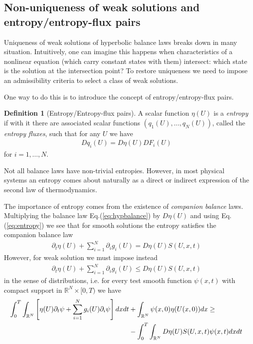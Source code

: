 \documentclass[11pt, reqno]{amsart}
\newcommand{\eqr}[1]{Eq.\thinspace(#1)}
\newcommand{\spfrac}[2]{{\partial_{#1}} {#2}}
\theoremstyle{definition}
\newtheorem{dfn}{Definition}
\begin{document}
\subsection{Non-uniqueness of weak solutions and entropy/entropy-flux pairs}

Uniqueness of weak solutions of hyperbolic balance laws breaks down in
many situation. Intuitively, one can imagine this happens when
characteristics of a nonlinear equation (which carry constant states
with them) intersect: which state is the solution at the intersection
point?  To restore uniqueness we need to impose an admissibility
criteria to select a class of weak solutions.

One way to do this is to introduce the concept of entropy/entropy-flux
pairs.
\begin{dfn}[Entropy/Entropy-flux pairs]
  A scalar function $\eta(U)$ is a \emph{entropy} if with it there are
  associated scalar functions $\left(q_1(U), \ldots, q_N(U)\right)$,
  called the \emph{entropy fluxes}, such that for any $U$ we have
  \begin{align}
    Dq_i(U) = D\eta(U) DF_i(U) \label{eq:entropy}
  \end{align}
  for $i=1,\ldots,N$.
\end{dfn}
Not all balance laws have non-trivial entropies. However, in most
physical systems an entropy comes about naturally as a direct or
indirect expression of the second law of thermodynamics. 

The importance of entropy comes from the existence of \emph{companion
  balance} laws. Multiplying the balance law \eqr{\ref{eq:hypbalance}}
by $D\eta(U)$ and using \eqr{\ref{eq:entropy}} we see that for smooth
solutions the entropy satisfies the companion balance law
\begin{align}
  \spfrac{t}{\eta(U)} 
  +
  \sum_{i=1}^N \spfrac{i}{g_i(U)} 
  =
  D\eta(U) S(U,x,t) 
  \label{eq:entropy-balance}
\end{align}
However, for weak solution we must impose instead
\begin{align}
  \spfrac{t}{\eta(U)} 
  +
  \sum_{i=1}^N \spfrac{i}{g_i(U)} 
  \le
  D\eta(U) S(U,x,t)   
  \label{eq:entropy-balance-weak}
\end{align}
in the sense of distributions, i.e. for every test smooth function
$\psi(x,t)$ with compact support in $\mathbb{R}^N\times[0,T)$ we have
\begin{align}
  \int_0^T\int_{\mathbb{R}^N}
  \left[
    \eta(U)\spfrac{t}{\psi}
    +
    \sum_{i=1}^N g_i(U)\spfrac{i}{\psi}
  \right]
  dx dt
  &+
  \int_{\mathbb{R}^N}
  \psi(x,0)\eta(U(x,0)) dx
  \ge \notag \\
  &-
  \int_0^T\int_{\mathbb{R}^N}
  D\eta(U)S(U,x,t)\psi(x,t)
  dx dt  
\end{align}
\end{document}
